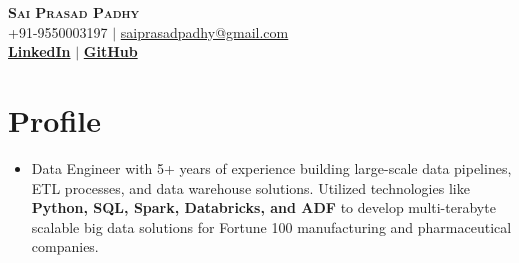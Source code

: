 \documentclass[letterpaper,11pt]{article}
\begin{document}




\begin{center}
    \textbf{\Huge \scshape Sai Prasad Padhy} \\ \vspace{1pt}
    \small +91-9550003197 $|$ \href{mailto:mverma6250@gmail.com}{{saiprasadpadhy@gmail.com}}    \\ 
    \small  
    \href{https://www.linkedin.com/in/saiprasadpadhy/}{\bf LinkedIn} $|$
    \href{https://github.com/padhysai}{\bf GitHub} 
    
\end{center}



\section{Profile}
\begin{itemize}[leftmargin=0.15in, label={}]
\item 
Data Engineer with 5+ years of experience building large-scale data pipelines, ETL processes, and data warehouse solutions. Utilized technologies like \textbf{Python, SQL, Spark, Databricks, and ADF} to develop multi-terabyte scalable big data solutions for Fortune 100 manufacturing and pharmaceutical companies.
\end{itemize}
\end{document}
